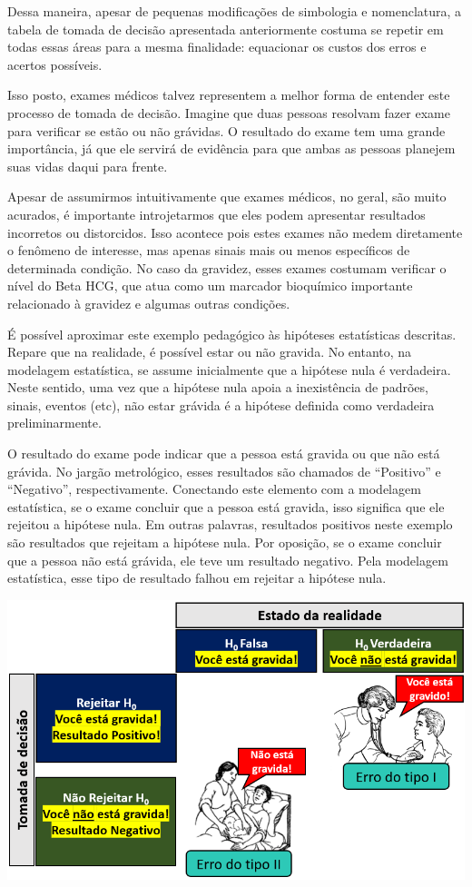 \documentclass[
]{book}
\begin{document}
Dessa maneira, apesar de pequenas modificações de simbologia e nomenclatura, a tabela de tomada de decisão apresentada anteriormente costuma se repetir em todas essas áreas para a mesma finalidade: equacionar os custos dos erros e acertos possíveis.

Isso posto, exames médicos talvez representem a melhor forma de entender este processo de tomada de decisão. Imagine que duas pessoas resolvam fazer exame para verificar se estão ou não grávidas. O resultado do exame tem uma grande importância, já que ele servirá de evidência para que ambas as pessoas planejem suas vidas daqui para frente.

Apesar de assumirmos intuitivamente que exames médicos, no geral, são muito acurados, é importante introjetarmos que eles podem apresentar resultados incorretos ou distorcidos. Isso acontece pois estes exames não medem diretamente o fenômeno de interesse, mas apenas sinais mais ou menos específicos de determinada condição. No caso da gravidez, esses exames costumam verificar o nível do Beta HCG, que atua como um marcador bioquímico importante relacionado à gravidez e algumas outras condições.

É possível aproximar este exemplo pedagógico às hipóteses estatísticas descritas. Repare que na realidade, é possível estar ou não gravida. No entanto, na modelagem estatística, se assume inicialmente que a hipótese nula é verdadeira. Neste sentido, uma vez que a hipótese nula apoia a inexistência de padrões, sinais, eventos (etc), não estar grávida é a hipótese definida como verdadeira preliminarmente.

O resultado do exame pode indicar que a pessoa está gravida ou que não está grávida. No jargão metrológico, esses resultados são chamados de ``Positivo'' e ``Negativo'', respectivamente. Conectando este elemento com a modelagem estatística, se o exame concluir que a pessoa está gravida, isso significa que ele rejeitou a hipótese nula. Em outras palavras, resultados positivos neste exemplo são resultados que rejeitam a hipótese nula. Por oposição, se o exame concluir que a pessoa não está grávida, ele teve um resultado negativo. Pela modelagem estatística, esse tipo de resultado falhou em rejeitar a hipótese nula.

\includegraphics{./img/cap_inferencia_tabela_decisao2.png}
\end{document}
